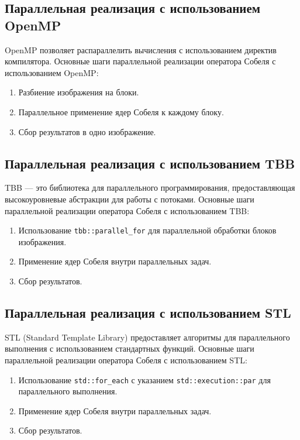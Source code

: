 \documentclass[]{article}
\theoremstyle{remark}
\theoremstyle{definition}
\begin{document}
\subsection{Параллельная реализация с использованием OpenMP}

\par OpenMP позволяет распараллелить вычисления с использованием директив компилятора. Основные шаги параллельной реализации оператора Собеля с использованием OpenMP:

\begin{enumerate}
    \item Разбиение изображения на блоки.
    \item Параллельное применение ядер Собеля к каждому блоку.
    \item Сбор результатов в одно изображение.
\end{enumerate}

\subsection{Параллельная реализация с использованием TBB}

\par TBB — это библиотека для параллельного программирования, предоставляющая высокоуровневые абстракции для работы с потоками. Основные шаги параллельной реализации оператора Собеля с использованием TBB:

\begin{enumerate}
    \item Использование \texttt{tbb::parallel\_for} для параллельной обработки блоков изображения.
    \item Применение ядер Собеля внутри параллельных задач.
    \item Сбор результатов.
\end{enumerate}

\subsection{Параллельная реализация с использованием STL}

\par STL (Standard Template Library) предоставляет алгоритмы для параллельного выполнения с использованием стандартных функций. Основные шаги параллельной реализации оператора Собеля с использованием STL:

\begin{enumerate}
    \item Использование \texttt{std::for\_each} с указанием \texttt{std::execution::par} для параллельного выполнения.
    \item Применение ядер Собеля внутри параллельных задач.
    \item Сбор результатов.
\end{enumerate}
\end{document}
